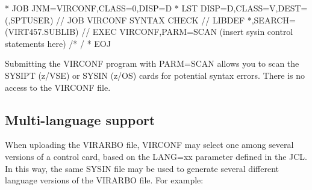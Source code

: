 \documentclass[letterpaper,10pt,english]{sphinxmanual}
\begin{document}
\begin{sphinxVerbatim}[commandchars=\\\{\}]
* \PYGZdl{}\PYGZdl{} JOB JNM=VIRCONF,CLASS=0,DISP=D
* \PYGZdl{}\PYGZdl{} LST DISP=D,CLASS=V,DEST=(,SPTUSER)
// JOB VIRCONF SYNTAX CHECK
// LIBDEF *,SEARCH=(VIRT457.SUBLIB)
// EXEC VIRCONF,PARM=\PYGZsq{}SCAN\PYGZsq{}
        (insert sysin control statements here)
/*
/\PYGZam{}
* \PYGZdl{}\PYGZdl{} EOJ
\end{sphinxVerbatim}


\begin{sphinxVerbatim}[commandchars=\\\{\}]
  
   
  
  
  
  
            
\end{sphinxVerbatim}


Submitting the VIRCONF program with PARM=SCAN allows you to scan the SYSIPT (z/VSE) or SYSIN (z/OS) cards for potential syntax errors. There is no access to the VIRCONF file.


\subsection{Multi-language support}
\label{\detokenize{Installation_Guide:multi-language-support}}\label{\detokenize{Installation_Guide:index-24}}
When uploading the VIRARBO file, VIRCONF may select one among several versions of a control card, based on the LANG=xx parameter defined in the JCL. In this way, the same SYSIN file may be used to generate several different language versions of the VIRARBO file. For example:
\end{document}
